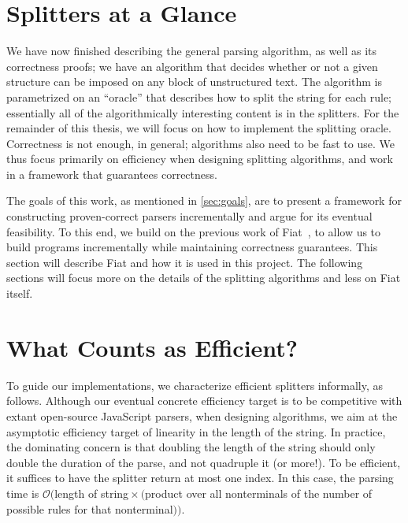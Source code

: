 \section{Splitters at a Glance}
  We have now finished describing the general parsing algorithm, as well as its correctness proofs; we have an algorithm that decides whether or not a given structure can be imposed on any block of unstructured text.  The algorithm is parametrized on an ``oracle'' that describes how to split the string for each rule; essentially all of the algorithmically interesting content is in the splitters.  For the remainder of this thesis, we will focus on how to implement the splitting oracle.  Correctness is not enough, in general; algorithms also need to be fast to use.  We thus focus primarily on efficiency when designing splitting algorithms, and work in a framework that guarantees correctness.
  
  The goals of this work, as mentioned in \autoref{sec:goals}, are to present a framework for constructing proven-correct parsers incrementally and argue for its eventual feasibility.  To this end, we build on the previous work of Fiat~\cite{fiat}, to allow us to build programs incrementally while maintaining correctness guarantees.  This section will describe Fiat and how it is used in this project.  The following sections will focus more on the details of the splitting algorithms and less on Fiat itself.
  
\section{What Counts as Efficient?}
  To guide our implementations, we characterize efficient splitters informally, as follows.  Although our eventual concrete efficiency target is to be competitive with extant open-source JavaScript parsers, when designing algorithms, we aim at the asymptotic efficiency target of linearity in the length of the string.  In practice, the dominating concern is that doubling the length of the string should only double the duration of the parse, and not quadruple it (or more!).  %
  To be efficient, it suffices to have the splitter return at most one index.  In this case, the parsing time is $\mathcal O($length of string${} \times ($product over all nonterminals of the number of possible rules for that nonterminal$))$.
    
